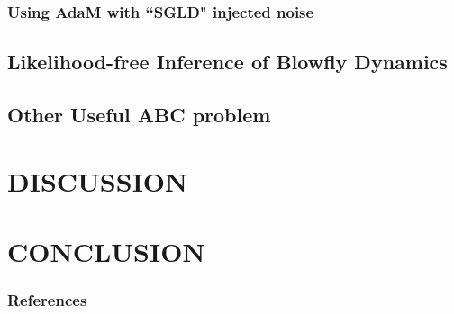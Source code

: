 \documentclass[]{article}
\begin{document}
\subsubsection{Using AdaM with ``SGLD" injected noise}

\subsection{Likelihood-free Inference of Blowfly Dynamics}

\subsection{Other Useful ABC problem}

\section{DISCUSSION} \label{discussion}

\section{CONCLUSION} \label{conclusion}

\subsubsection*{References}
\newpage
{

}
\end{document}
